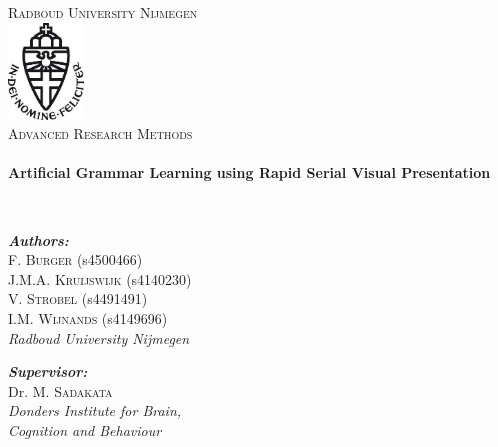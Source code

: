 \begin{titlepage}
\begin{center}

\textsc{\LARGE Radboud University Nijmegen}\\[1cm]

\includegraphics[width=0.15\textwidth]{media/ru-logo}~\\[1cm]

\textsc{\Large Advanced Research Methods}\\[0.6cm]

\HRule \\[0.4cm]
{ \huge \bfseries Artificial Grammar Learning using Rapid Serial Visual Presentation \\[0.4cm] }

\HRule \\[1.2cm]

\begin{flushleft} \large
\emph{\textbf{Authors:}}\\
F. \textsc{Burger} (s4500466)\\
J.M.A. \textsc{Kruijswijk} (s4140230)\\
V. \textsc{Strobel} (s4491491)\\
I.M. \textsc{Wijnands} (s4149696)\\
\emph{Radboud University Nijmegen}\\
\end{flushleft}
\begin{flushleft} \large
\emph{\textbf{Supervisor:}} \\
Dr. M. \textsc{Sadakata}\\
\emph{Donders Institute for Brain,\\
Cognition and Behaviour}\\
\end{flushleft}



\end{center}
\end{titlepage}
